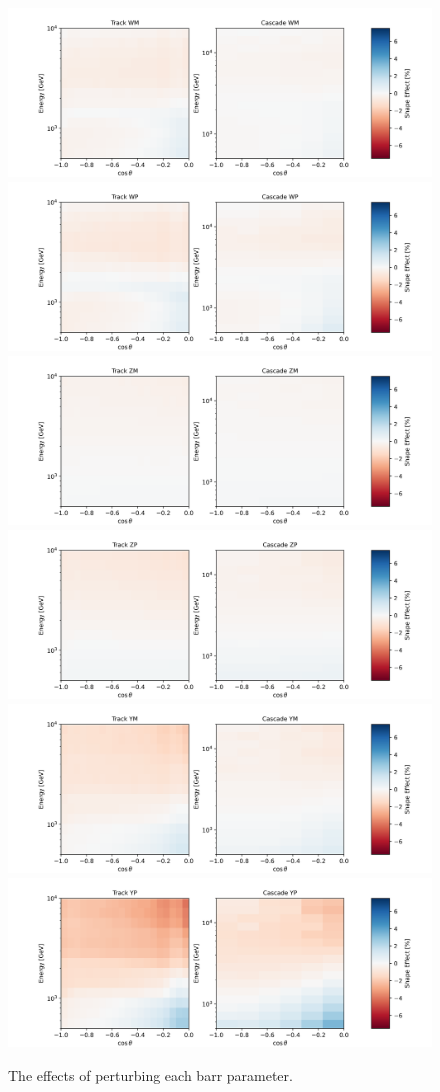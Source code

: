 \documentclass[main.tex]{subfiles}
\begin{document}
\begin{figure}
    \centering
    \includegraphics[width=0.45\linewidth]{./figures/systematics/WM.png}%
    \includegraphics[width=0.45\linewidth]{./figures/systematics/WP.png}
    \includegraphics[width=0.45\linewidth]{./figures/systematics/ZM.png}%
    \includegraphics[width=0.45\linewidth]{./figures/systematics/ZP.png}
    \includegraphics[width=0.45\linewidth]{./figures/systematics/YM.png}%
    \includegraphics[width=0.45\linewidth]{./figures/systematics/YP.png}
    \caption{The effects of perturbing each barr parameter.}
\end{figure}
\end{document}
